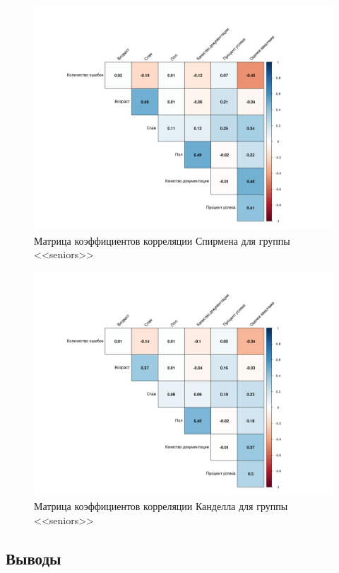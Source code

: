 \begin{figure}[H]
	\centering
	\includegraphics[width=\linewidth]{cor5}
	\caption{Матрица коэффициентов корреляции Спирмена для группы <<seniors>>}
	\label{cor5}
\end{figure}

\begin{figure}[H]
	\centering
	\includegraphics[width=\linewidth]{cor6}
	\caption{Матрица коэффициентов корреляции Канделла для группы <<seniors>>}
	\label{cor6}
\end{figure}


\subsection{Выводы}
